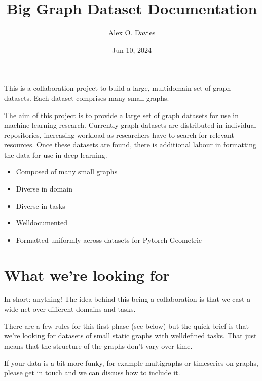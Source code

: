 \documentclass[letterpaper,10pt,english]{sphinxhowto}
\title{Big Graph Dataset Documentation}
\date{Jun 10, 2024}
\author{Alex O. Davies}
\begin{document}
\pagestyle{empty}
\sphinxmaketitle
\pagestyle{plain}
\sphinxtableofcontents
\pagestyle{normal}
\label{\detokenize{index::doc}}


\sphinxAtStartPar
This is a collaboration project to build a large, multi\sphinxhyphen{}domain set of graph datasets.
Each dataset comprises many small graphs.

\sphinxAtStartPar
The aim of this project is to provide a large set of graph datasets for use in machine learning research.
Currently graph datasets are distributed in individual repositories, increasing workload as researchers have to search for relevant resources.
Once these datasets are found, there is additional labour in formatting the data for use in deep learning.
\begin{description}
\begin{itemize}
\item {} 
\sphinxAtStartPar
Composed of many small graphs

\item {} 
\sphinxAtStartPar
Diverse in domain

\item {} 
\sphinxAtStartPar
Diverse in tasks

\item {} 
\sphinxAtStartPar
Well\sphinxhyphen{}documented

\item {} 
\sphinxAtStartPar
Formatted uniformly across datasets for Pytorch Geometric

\end{itemize}

\end{description}


\section{What we’re looking for}
\label{\detokenize{index:what-we-re-looking-for}}
\sphinxAtStartPar
In short: anything! The idea behind this being a collaboration is that we cast a wide net over different domains and tasks.

\sphinxAtStartPar
There are a few rules for this first phase (see below) but the quick brief is that we’re looking for datasets of small static graphs with well\sphinxhyphen{}defined tasks.
That just means that the structure of the graphs don’t vary over time.

\sphinxAtStartPar
If your data is a bit more funky, for example multi\sphinxhyphen{}graphs or time\sphinxhyphen{}series on graphs, please get in touch and we can discuss how to include it.
\end{document}
